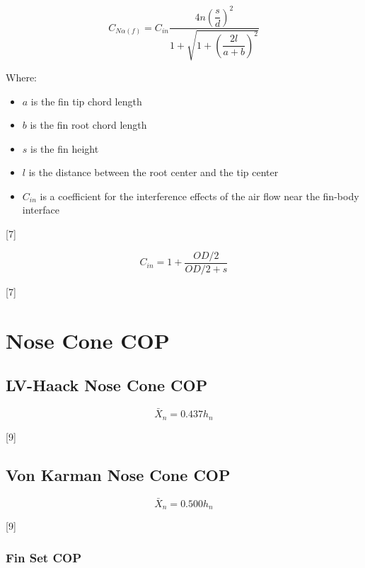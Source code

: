 \documentclass[]{book}
\providecommand{\tightlist}{%
  \setlength{\itemsep}{0pt}\setlength{\parskip}{0pt}}
\begin{document}
\begin{equation}
\label{eq_sd_fin_set}
C_{N \alpha(f)} = C_{in}\dfrac{4n \left( \dfrac{s}{d} \right)^2}{1 + \sqrt{1 + \left( \dfrac{2 l}{a + b} \right)^2}}
\end{equation}

Where:

\begin{itemize}
\tightlist
\item
  \(a\) is the fin tip chord length
\item
  \(b\) is the fin root chord length
\item
  \(s\) is the fin height
\item
  \(l\) is the distance between the root center and the tip center
\item
  \(C_{in}\) is a coefficient for the interference effects of the air
  flow near the fin-body interface
\end{itemize}

{[}7{]}

\begin{equation}
\label{eq_sd_interference}
C_{in} = 1 + \dfrac{OD/2}{OD/2 + s}
\end{equation}

{[}7{]}

\section{Nose Cone COP}\label{nose-cone-cop}

\subsection{LV-Haack Nose Cone COP}\label{lv-haack-nose-cone-cop}

\begin{equation}
\label{eq_cop_lv_haack}
\bar{X}_n = 0.437 h_n
\end{equation}

{[}9{]}

\subsection{Von Karman Nose Cone COP}\label{von-karman-nose-cone-cop}

\begin{equation}
\label{eq_cop_von_karman}
\bar{X}_n = 0.500 h_n
\end{equation}

{[}9{]}

\subsubsection{Fin Set COP}\label{fin-set-cop}
\end{document}
